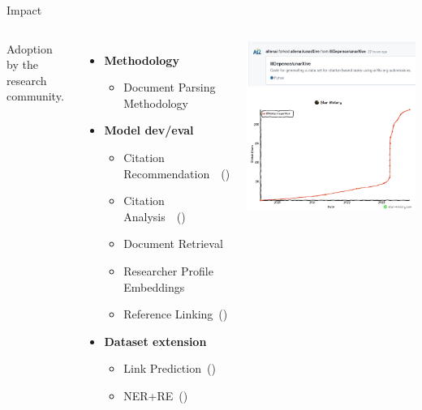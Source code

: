 \documentclass[en,16:9,smallfoot]{sdqbeamer}
\begin{document}
   \begin{frame}{Impact}
   \begin{columns}
        Adoption by the research community.

        \begin{itemize}
            \item \textbf{Methodology}
            \begin{itemize}
                \item Document Parsing Methodology~\cite{Lo2020}
            \end{itemize}
            \item \textbf{Model dev/eval}
            \begin{itemize}
                \item Citation Recommendation~\cite{Citcom2021}~(\cite{Saier2019,HybridCite2020})
                \item Citation Analysis~\cite{Veneri2022,Xue2021}~(\cite{Saier2020xling,Saier2021})
                \item Document Retrieval~\cite{Parisot2022}
                \item Researcher Profile Embeddings~\cite{Mochihashi2023}
                \item Reference Linking~(\cite{Saier2022ULITE})
            \end{itemize}
            \item \textbf{Dataset extension}
            \begin{itemize}
                \item Link Prediction~(\cite{Saier2023cocon})
                \item NER+RE~(\cite{Saier2024HyperPIE})
            \end{itemize}
        \end{itemize}
            \centering
            \includegraphics[width=0.75\linewidth]{imgs/a2ifork}
   \end{columns}
   \end{frame}
\end{document}
